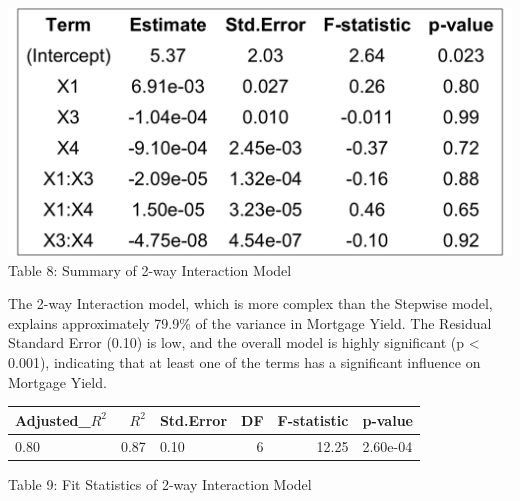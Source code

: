 \documentclass[
  12pt,
]{article}
\begin{document}
\begin{minipage}{0.5\textwidth}
\includegraphics[width=1.25\linewidth]{figures/interaction_model_coef.png}
\vspace{-0.3em}
\fontsize{12}{12}\selectfont Table 8: Summary of 2-way Interaction Model
\end{minipage}
\hfill
\begin{minipage}{0.35\textwidth}
The 2-way Interaction model, which is more complex than the Stepwise
model, explains approximately 79.9\% of the variance in Mortgage Yield.
The Residual Standard Error (0.10) is low, and the overall model is
highly significant (p < 0.001), indicating that at least one of the
terms has a significant influence on Mortgage Yield.
\end{minipage}

\begin{table}[!h]
\centering\begingroup\fontsize{8}{10}\selectfont

\begin{tabular}{lrlrrl}
\toprule
Adjusted\_$R^{2}$ & $R^2$ & Std.Error & DF & F-statistic & p-value\\
\midrule
0.80 & 0.87 & 0.10 & 6 & 12.25 & 2.60e-04\\
\bottomrule
\end{tabular}
\endgroup{}
\end{table}
\begin{center}
\vspace{-1.5em}
{\fontsize{12}{14}\selectfont Table 9: Fit Statistics of 2-way Interaction Model\par}
\end{center}

\addtocounter{table}{2}
\end{document}

